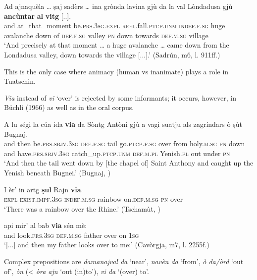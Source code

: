 \ea

\gll    Ad ajnaquèla … ṣaj sadèrs … ina grònda lavina gjù da la val Lòndadusa gjù \textbf{ancùntar} \textbf{al} \textbf{vitg} [..].\\
and at\_that\_moment {} be.\textsc{prs.3sg.expl} \textsc{refl.}fall.\textsc{ptcp.unm} {} \textsc{indef.f.sg} huge avalanche down of \textsc{def.f.sg} valley \textsc{pn} down towards \textsc{def.m.sg} village\\
\glt `And precisely at that moment … a huge avalanche … came down from the Londadusa valley, down towards the village [...].' (Sadrún, m6, l. 911ff.)
\z

This is the only case where animacy (human vs inanimate) plays a role in Tuatschin.

\textit{Via} instead of \textit{vi} `over' is rejected by some informants; it occurs, however, in Büchli (1966) as well as in the oral corpus.

\ea
\label{ex:via1}
\gll A lu ségi la cúa ida \textbf{via} da Sòntg Antòni gjù a vagi suatju als zagríndars ò ṣùt Bugnaj.\\
and then be.\textsc{prs.sbjv.3sg} \textsc{def.f.sg} tail go.\textsc{ptcp.f.sg} over from holy.\textsc{m.sg} \textsc{pn} down and have.\textsc{prs.sbjv.3sg} catch\_up.\textsc{ptcp.unm} \textsc{def.m.pl} Yenish.\textsc{pl} out under \textsc{pn}\\
\glt `And then the tail went down by [the chapel of] Saint Anthony and caught up the Yenish beneath Bugnei.' (Bugnaj, \citealt[132]{Büchli1966})
\z

\ea
\label{ex:via2}
\gll I èr' in artg \textbf{ṣul} Rajn \textbf{via}.\\
\textsc{expl} \textsc{exist.impf.3sg} \textsc{indef.m.sg} rainbow on.\textsc{def.m.sg} \textsc{pn} over\\
\glt `There was a rainbow over the Rhine.' (Tschamùt, \citealt[15]{Büchli1966})
\z

\ea
\label{ex:via3}
\gll  [...] api mir’ al bab \textbf{via} sén mè:\\
{} and look.\textsc{prs.3sg} \textsc{def.m.sg} father over on \textsc{1sg} \\
\glt `[...] and then my father looks over to me:' (Cavòrgja, m7, l. 2255f.)
\z

Complex prepositions are \textit{damanajval da} `near', \textit{navèn da} `from', \textit{ò da/òrd} `out of', \textit{òn} (< \textit{òra ajn} `out (in)to'), \textit{vi da} `(over) to'.

\ea

